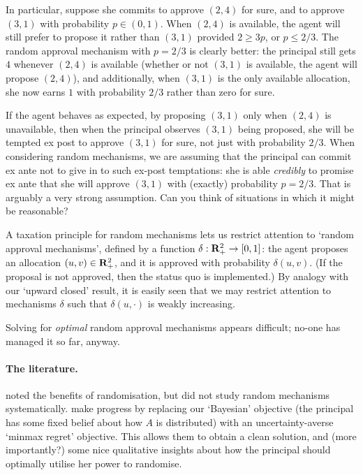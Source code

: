 In particular, suppose she commits to approve $(2,4)$ for sure,
and to approve $(3,1)$ with probability $p \in (0,1)$.
When $(2,4)$ is available, the agent will still prefer to propose it rather than $(3,1)$ provided $2 \geq 3p$, or $p \leq 2/3$.
The random approval mechanism with $p=2/3$ is clearly better:
the principal still gets $4$ whenever $(2,4)$ is available (whether or not $(3,1)$ is available, the agent will propose $(2,4)$),
and additionally, when $(3,1)$ is the only available allocation,
she now earns $1$ with probability $2/3$ rather than zero for sure.

\begin{remark}
	\label{remark:randomisation_commitment}
	If the agent behaves as expected, by proposing $(3,1)$ only when $(2,4)$ is unavailable, then when the principal observes $(3,1)$ being proposed, she will be tempted ex post to approve $(3,1)$ for sure, not just with probability $2/3$.
	When considering random mechanisms,
	we are assuming that the principal can commit ex ante not to give in to such ex-post temptations:
	she is able \emph{credibly} to promise ex ante that she will approve $(3,1)$ with (exactly) probability $p=2/3$.
	That is arguably a very strong assumption. Can you think of situations in which it might be reasonable?
\end{remark}

A taxation principle for random mechanisms lets us restrict attention to `random approval mechanisms', defined by a function $\delta : \mathbf{R}_+^2 \to [0,1]$: the agent proposes an allocation $(u,v) \in \mathbf{R}_+^2$, and it is approved with probability $\delta(u,v)$. (If the proposal is not approved, then the status quo is implemented.)
By analogy with our `upward closed' result, it is easily seen that we may restrict attention to mechanisms $\delta$ such that $\delta(u,\cdot)$ is weakly increasing.

Solving for \emph{optimal} random approval mechanisms appears difficult; no-one has managed it so far, anyway.


\paragraph{The literature.}
\textcite{ArmstrongVickers2010} noted the benefits of randomisation, but did not study random mechanisms systematically.
\textcite{GuoShmaya2021} make progress by replacing our `Bayesian' objective (the principal has some fixed belief about how $A$ is distributed)
with an uncertainty-averse `minmax regret' objective.
This allows them to obtain a clean solution,
and (more importantly?) some nice qualitative insights about how the principal should optimally utilise her power to randomise.



